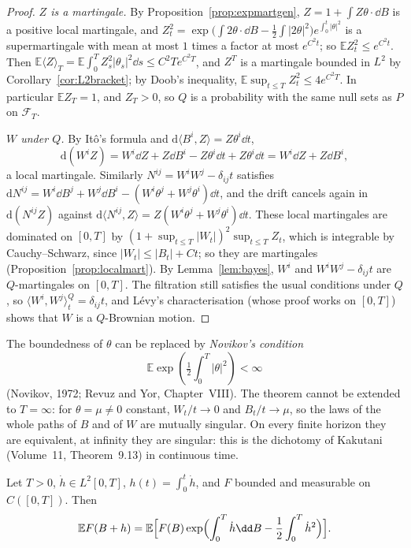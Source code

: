 \begin{proof}
\emph{$Z$ is a martingale.} By Proposition~\ref{prop:expmartgen}, $Z=1+\int Z\theta\cdot\dd B$ is a positive local martingale, and $Z_t^2=\exp\bigl(\int2\theta\cdot\dd B-\frac12\int|2\theta|^2\bigr)e^{\int_0^t|\theta|^2}$ is a
supermartingale with mean at most $1$ times a factor at most $e^{C^2t}$; so $\mathbb EZ_t^2\le e^{C^2t}$. Then $\mathbb E\langle Z\rangle_T=\mathbb E\int_0^TZ_s^2|\theta_s|^2\dd s\le C^2Te^{C^2T}$, and $Z^T$ is a martingale bounded in
$L^2$ by Corollary~\ref{cor:L2bracket}; by Doob's inequality, $\mathbb E\sup_{t\le T}Z_t^2\le4e^{C^2T}$. In particular $\mathbb EZ_T=1$, and $Z_T>0$, so $Q$ is a probability with the same null sets as $P$ on $\mathcal F_T$.

\emph{$W$ under $Q$.} By It\^o's formula and $\mathrm d\langle B^i,Z\rangle=Z\theta^i\dd t$,
\[
\mathrm d(W^iZ)=W^i\dd Z+Z\dd B^i-Z\theta^i\dd t+Z\theta^i\dd t=W^i\dd Z+Z\dd B^i,
\]
a local martingale. Similarly $N^{ij}=W^iW^j-\delta_{ij}t$ satisfies $\mathrm dN^{ij}=W^i\dd B^j+W^j\dd B^i-(W^i\theta^j+W^j\theta^i)\dd t$, and the drift cancels again in $\mathrm d(N^{ij}Z)$ against
$\mathrm d\langle N^{ij},Z\rangle=Z(W^i\theta^j+W^j\theta^i)\dd t$. These local martingales are dominated on $[0,T]$ by $(1+\sup_{t\le T}|W_t|)^2\sup_{t\le T}Z_t$, which is integrable by Cauchy--Schwarz, since
$|W_t|\le|B_t|+Ct$; so they are martingales (Proposition~\ref{prop:localmart}). By Lemma~\ref{lem:bayes}, $W^i$ and $W^iW^j-\delta_{ij}t$ are $Q$-martingales on $[0,T]$. The filtration still satisfies the usual
conditions under $Q$, so $\langle W^i,W^j\rangle^Q_t=\delta_{ij}t$, and L\'evy's characterisation (whose proof works on $[0,T]$) shows that $W$ is a $Q$-Brownian motion.
\end{proof}

\begin{remark}
The boundedness of $\theta$ can be replaced by \emph{Novikov's condition}
\[
\mathbb E\exp(\tfrac12\int_0^T|\theta|^2)<\infty
\]
(Novikov, 1972; Revuz and Yor, Chapter~VIII). The theorem cannot be extended to $T=\infty$:
for $\theta=\mu\ne0$ constant, $W_t/t\to0$ and $B_t/t\to\mu$, so the laws of the whole paths of $B$ and of $W$ are mutually singular. On every finite horizon they are equivalent, at infinity they are singular: this is the
dichotomy of Kakutani (Volume~11, Theorem~9.13) in continuous time.
\end{remark}

\begin{corollary}\label{cor:cameronmartin}
Let $T>0$, $\dot h\in L^2[0,T]$, $h(t)=\int_0^t\dot h$, and $F$ bounded and measurable on $C([0,T])$. Then
\[
\mathbb EF(B+h)=\mathbb E\Bigl[F(B)\exp\Bigl(\int_0^T\dot h\dd B-\frac12\int_0^T\dot h^2\Bigr)\Bigr].
\]
\end{corollary}

